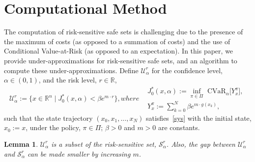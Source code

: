 \documentclass[letterpaper, 10 pt, conference]{ieeeconf}  %
\newtheorem{lemma}{Lemma}
\begin{document}
\section{Computational Method}\label{alg}
The computation of risk-sensitive safe sets is challenging due to the presence of the maximum of costs (as opposed to a summation of costs)
and the use of Conditional Value-at-Risk (as opposed to an expectation). In this paper, we provide under-approximations 
for risk-sensitive safe sets, and an algorithm to compute these under-approximations. Define $\mathcal{U}_\alpha^r$
for the confidence level, $\alpha \in (0,1)$, and the risk level, $r \in \mathbb{R}$,
\begin{subequations}\label{under}\begin{equation}
\mathcal{U}_\alpha^r := \{x \in \mathbb{R}^n \mid J_0^*(x,\alpha) < \beta e^{m\cdot r} \},
\end{equation}
where
\begin{equation}\begin{aligned}
& J_0^*(x,\alpha) := {\underset{\pi \in \Pi}\inf} \text{ CVaR}_\alpha \big[ Y_x^\pi \big],\\
& Y_x^\pi := \textstyle\sum_{k=0}^N \beta e^{m\cdot g(x_k)},
\end{aligned}\end{equation}
\end{subequations}
such that the state trajectory $(x_0, x_1, ..., x_N)$
satisfies~\eqref{sys} with the initial state, $x_0 := x$, under the policy, $\pi \in \Pi$;
$\beta > 0$ and $m > 0$ are constants.
\begin{lemma}\label{lemma2}
$\mathcal{U}_\alpha^r$ is a subset of the risk-sensitive set, $\mathcal{S}_\alpha^r$. 
Also, the gap between $\mathcal{U}_\alpha^r$ and $\mathcal{S}_\alpha^r$ can be made smaller by increasing $m$.
\end{lemma}
\end{document}
